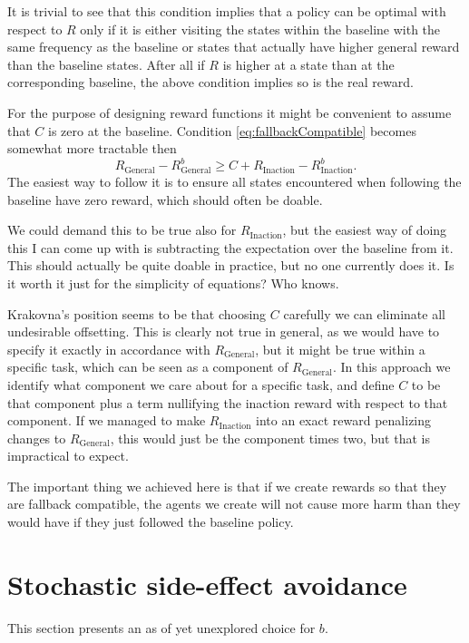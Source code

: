 \documentclass{article}
\newcommand{\rewardFunction}{R}
\newcommand{\generalRewardFunction}{\rewardFunction_{\mathrm{General}}}
\newcommand{\inactionRewardFunction}{\rewardFunction_{\mathrm{Inaction}}}
\newcommand{\corruption}{C}
\newcommand{\baseline}{b}
\begin{document}
		It is trivial to see that this condition implies that a policy can be optimal with respect to
		$\rewardFunction$ only if it is either visiting the states within the baseline with the same
		frequency as the baseline	or states that actually have higher general reward than the baseline
		states. After all if $\rewardFunction$ is higher at a state than at the corresponding baseline,
		the above condition implies so is the real reward.

		For the purpose of designing reward functions it might be convenient to assume
		that $\corruption$ is zero at the baseline. Condition \eqref{eq:fallbackCompatible}
		becomes somewhat more tractable then
		\begin{equation*}
				\generalRewardFunction - \generalRewardFunction^\baseline \geq
				\corruption + \inactionRewardFunction - \inactionRewardFunction^\baseline.
		\end{equation*}
		The easiest way to follow it is to ensure all states encountered
		when following the baseline have zero reward, which should often be doable.

		We could demand this to be true also for $\inactionRewardFunction$, but the easiest way of
		doing this I can come up with is subtracting the expectation over the baseline from it.
		This should actually be quite doable in practice, but no one currently does it.
		Is it worth it just for the simplicity of equations? Who knows.

		Krakovna's position seems to be that choosing $\corruption$ carefully we can eliminate
		all undesirable offsetting. This is clearly not true in general, as we would have to specify
		it exactly in accordance with $\generalRewardFunction$, but it might be true within
		a specific task, which can be seen as a component of $\generalRewardFunction$. In this
		approach we identify what component we care about for a specific task, and define
		$\corruption$ to be that component plus a term nullifying the inaction reward
		with respect to that component. If we managed to make $\inactionRewardFunction$
		into an exact reward penalizing changes to $\generalRewardFunction$, this would just be
		the component times two, but that is impractical to expect.

		The important thing we achieved here is that if we create rewards so that they are fallback
		compatible, the agents we create will not cause more harm than they would have if they
		just followed the baseline policy.

\section{Stochastic side-effect avoidance}
	This section presents an as of yet unexplored choice for $\baseline$.
\end{document}
